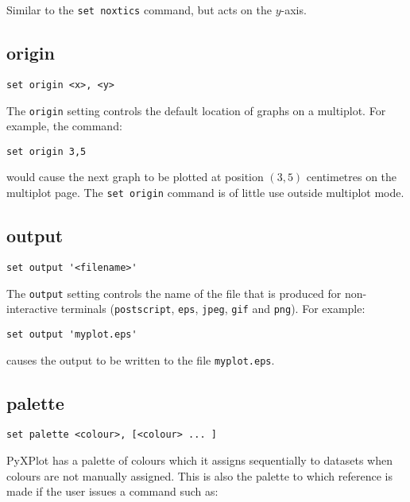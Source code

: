 Similar to the {\tt set noxtics} command, but acts on the $y$-axis.


\subsection{origin}

\begin{verbatim}
set origin <x>, <y>
\end{verbatim}

The {\tt origin} setting controls the default location of graphs on a multiplot.
For example, the command:

\begin{verbatim}
set origin 3,5
\end{verbatim}

\noindent would cause the next graph to be plotted at position $(3,5)$ centimetres on the
multiplot page. The {\tt set origin} command is of little use outside multiplot
mode.


\subsection{output}

\begin{verbatim}
set output '<filename>'
\end{verbatim}

The {\tt output} setting controls the name of the file that is produced for
non-interactive terminals ({\tt postscript}, {\tt eps}, {\tt jpeg}, {\tt gif}
and {\tt png}).  For example:

\begin{verbatim}
set output 'myplot.eps'
\end{verbatim}

\noindent causes the output to be written to the file {\tt myplot.eps}.


\subsection{palette}

\begin{verbatim}
set palette <colour>, [<colour> ... ]
\end{verbatim}

PyXPlot has a palette of colours which it assigns sequentially to datasets when
colours are not manually assigned. This is also the palette to which reference
is made if the user issues a command such as:

